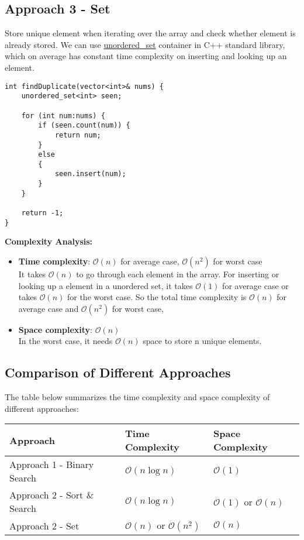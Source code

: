 \documentclass[justified]{tufte-book}
\begin{document}
\subsection{Approach 3 - Set}
Store unique element when iterating over the array and check whether element is already stored. We can use \href{http://www.cplusplus.com/reference/unordered_set/unordered_set/}{unordered\_set} container in C++ standard library, which on average has constant time complexity on inserting and looking up an element. 
\begin{lstlisting}
int findDuplicate(vector<int>& nums) {
    unordered_set<int> seen;
    
    for (int num:nums) {
        if (seen.count(num)) {
            return num;
        }
        else
        {
            seen.insert(num);
        }
    }
    
    return -1; 
}  
\end{lstlisting}
\noindent \textbf{Complexity Analysis:}
\begin{itemize}
    \item \textbf{Time complexity}: $\mathcal{O}(n)$ for average case, $\mathcal{O}(n^2)$ for worst case\\
    It takes $\mathcal{O}(n)$ to go through each element in the array. For inserting or looking up a element in a unordered set, it takes $\mathcal{O}(1)$ for average case or takes $\mathcal{O}(n)$ for the worst case. So the total time complexity is $\mathcal{O}(n)$ for average case and $\mathcal{O}(n^2)$ for worst case, 
    \item \textbf{Space complexity}: $\mathcal{O}(n)$ \\
    In the worst case, it needs $\mathcal{O}(n)$ space to store n unique elements. 
\end{itemize}

\subsection{Comparison of Different Approaches}
The table below summarizes the time complexity and space complexity of different approaches:
\begin{table}[ht]
  \centering
  \begin{tabular}{p{5cm}ll}
    \toprule
    Approach & Time Complexity & Space Complexity \\
    \midrule
    Approach 1 - Binary Search &  $\mathcal{O}(n\log n)$ & $\mathcal{O}(1)$\\
    Approach 2 - Sort \& Search &  $\mathcal{O}(n \log{n})$ & $\mathcal{O}(1)$ or $\mathcal{O}(n)$\\
    Approach 2 - Set &  $\mathcal{O}(n)$ or $\mathcal{O}(n^2)$ & $\mathcal{O}(n)$\\
    \bottomrule
  \end{tabular}
\end{table}
\end{document}
